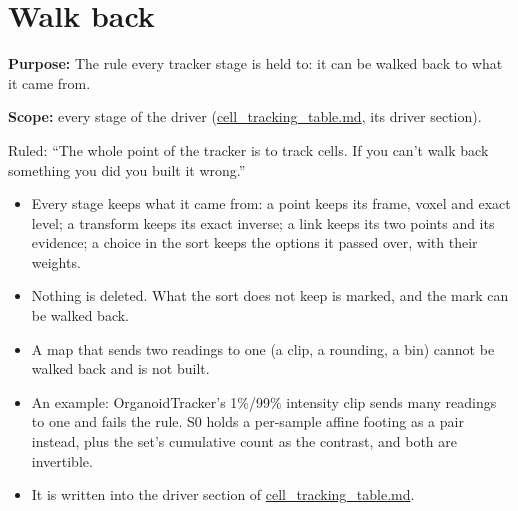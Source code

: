 \chapter{\texorpdfstring{Walk back}{Walk back}}
\label{chap:walk-back}

\textbf{Purpose:} The rule every tracker stage is held to: it can be walked back to what it came from.

\textbf{Scope:} every stage of the driver (\hyperref[chap:cell-tracking-table]{cell\_\allowbreak{}tracking\_\allowbreak{}table.md}, its driver section).

Ruled: “The whole point of the tracker is to track cells. If you can't walk back something you did you built it wrong.”

\begin{itemize}
\item Every stage keeps what it came from: a point keeps its frame, voxel and exact level; a transform keeps its exact inverse; a link keeps its two points and its evidence; a choice in the sort keeps the options it passed over, with their weights.
\item Nothing is deleted. What the sort does not keep is marked, and the mark can be walked back.
\item A map that sends two readings to one (a clip, a rounding, a bin) cannot be walked back and is not built.
\item An example: OrganoidTracker's 1\%/99\% intensity clip sends many readings to one and fails the rule. S0 holds a per-sample affine footing as a pair instead, plus the set's cumulative count as the contrast, and both are invertible.
\item It is written into the driver section of \hyperref[chap:cell-tracking-table]{cell\_\allowbreak{}tracking\_\allowbreak{}table.md}.
\end{itemize}
